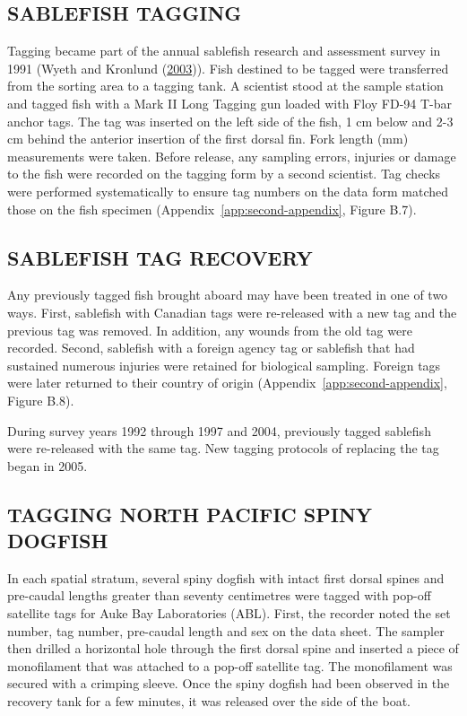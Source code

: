 \documentclass[12pt]{article}\usepackage[]{graphicx}\usepackage[]{color}
\begin{document}
\hypertarget{sablefish-tagging}{%
\subsection{SABLEFISH TAGGING}\label{sablefish-tagging}}

Tagging became part of the annual sablefish research and assessment survey in 1991 (Wyeth and Kronlund (\protect\hyperlink{ref-Wyeth2003}{2003})). Fish destined to be tagged were transferred from the sorting area to a tagging tank. A scientist stood at the sample station and tagged fish with a Mark II Long Tagging gun loaded with Floy FD-94 T-bar anchor tags. The tag was inserted on the left side of the fish, 1 cm below and 2-3 cm behind the anterior insertion of the first dorsal fin. Fork length (mm) measurements were taken. Before release, any sampling errors, injuries or damage to the fish were recorded on the tagging form by a second scientist. Tag checks were performed systematically to ensure tag numbers on the data form matched those on the fish specimen (Appendix~\ref{app:second-appendix}, Figure B.7).

\hypertarget{sablefish-tag-recovery}{%
\subsection{SABLEFISH TAG RECOVERY}\label{sablefish-tag-recovery}}

Any previously tagged fish brought aboard may have been treated in one of two ways. First, sablefish with Canadian tags were re-released with a new tag and the previous tag was removed. In addition, any wounds from the old tag were recorded. Second, sablefish with a foreign agency tag or sablefish that had sustained numerous injuries were retained for biological sampling. Foreign tags were later returned to their country of origin (Appendix~\ref{app:second-appendix}, Figure B.8).

During survey years 1992 through 1997 and 2004, previously tagged sablefish were re-released with the same tag. New tagging protocols of replacing the tag began in 2005.

\hypertarget{tagging-north-pacific-spiny-dogfish}{%
\subsection{TAGGING NORTH PACIFIC SPINY DOGFISH}\label{tagging-north-pacific-spiny-dogfish}}

In each spatial stratum, several spiny dogfish with intact first dorsal spines and pre-caudal lengths greater than seventy centimetres were tagged with pop-off satellite tags for Auke Bay Laboratories (ABL). First, the recorder noted the set number, tag number, pre-caudal length and sex on the data sheet. The sampler then drilled a horizontal hole through the first dorsal spine and inserted a piece of monofilament that was attached to a pop-off satellite tag. The monofilament was secured with a crimping sleeve. Once the spiny dogfish had been observed in the recovery tank for a few minutes, it was released over the side of the boat.
\end{document}
